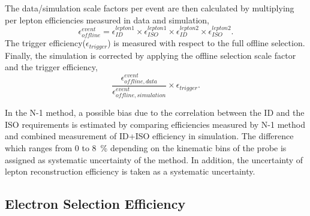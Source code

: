 The data/simulation scale factors per event are then calculated by 
multiplying per lepton efficiencies measured in data and simulation, 
\begin{equation} 
\epsilon_{offline}^{event} 
= 
\epsilon_{ID}^{lepton1} \times \epsilon_{ISO}^{lepton1}   
\times \epsilon_{ID}^{lepton2} \times \epsilon_{ISO}^{lepton2}.   
\end{equation} 
The trigger efficiency($\epsilon_{trigger}$) is measured with respect to the full 
offline selection. Finally, the simulation is corrected by applying the 
offline selection scale factor and the trigger efficiency, 
\begin{equation} 
\frac{\epsilon_{offline, data}^{event}}{\epsilon_{offline, simulation}^{event}} 
\times \epsilon_{trigger}. 
\end{equation} 

In the N-1 method, a possible bias due to the correlation between 
the ID and the ISO requirements is estimated by comparing efficiencies 
measured by N-1 method and combined measurement of ID+ISO efficiency in simulation. 
The difference which ranges from 0 to 8~\% depending 
on the kinematic bins of the probe is assigned as systematic uncertainty of the method.  
In addition, the uncertainty of lepton reconstruction efficiency is taken 
as a systematic uncertainty. 


\subsection{Electron Selection Efficiency}
\label{sec:electroneff}


